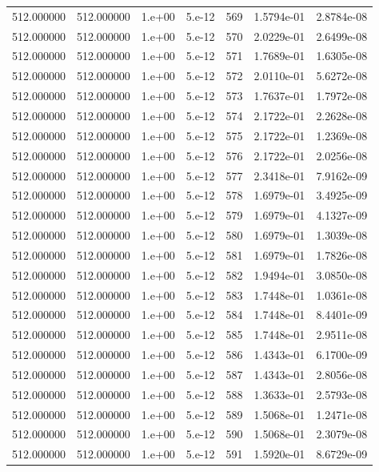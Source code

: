 \begin{table}[htbp]
\begin{tabular}{rrrrrrr}
512.000000 & 512.000000 & 1.e+00 & 5.e-12 & 569 & 1.5794e-01 & 2.8784e-08 \\
512.000000 & 512.000000 & 1.e+00 & 5.e-12 & 570 & 2.0229e-01 & 2.6499e-08 \\
512.000000 & 512.000000 & 1.e+00 & 5.e-12 & 571 & 1.7689e-01 & 1.6305e-08 \\
512.000000 & 512.000000 & 1.e+00 & 5.e-12 & 572 & 2.0110e-01 & 5.6272e-08 \\
512.000000 & 512.000000 & 1.e+00 & 5.e-12 & 573 & 1.7637e-01 & 1.7972e-08 \\
512.000000 & 512.000000 & 1.e+00 & 5.e-12 & 574 & 2.1722e-01 & 2.2628e-08 \\
512.000000 & 512.000000 & 1.e+00 & 5.e-12 & 575 & 2.1722e-01 & 1.2369e-08 \\
512.000000 & 512.000000 & 1.e+00 & 5.e-12 & 576 & 2.1722e-01 & 2.0256e-08 \\
512.000000 & 512.000000 & 1.e+00 & 5.e-12 & 577 & 2.3418e-01 & 7.9162e-09 \\
512.000000 & 512.000000 & 1.e+00 & 5.e-12 & 578 & 1.6979e-01 & 3.4925e-09 \\
512.000000 & 512.000000 & 1.e+00 & 5.e-12 & 579 & 1.6979e-01 & 4.1327e-09 \\
512.000000 & 512.000000 & 1.e+00 & 5.e-12 & 580 & 1.6979e-01 & 1.3039e-08 \\
512.000000 & 512.000000 & 1.e+00 & 5.e-12 & 581 & 1.6979e-01 & 1.7826e-08 \\
512.000000 & 512.000000 & 1.e+00 & 5.e-12 & 582 & 1.9494e-01 & 3.0850e-08 \\
512.000000 & 512.000000 & 1.e+00 & 5.e-12 & 583 & 1.7448e-01 & 1.0361e-08 \\
512.000000 & 512.000000 & 1.e+00 & 5.e-12 & 584 & 1.7448e-01 & 8.4401e-09 \\
512.000000 & 512.000000 & 1.e+00 & 5.e-12 & 585 & 1.7448e-01 & 2.9511e-08 \\
512.000000 & 512.000000 & 1.e+00 & 5.e-12 & 586 & 1.4343e-01 & 6.1700e-09 \\
512.000000 & 512.000000 & 1.e+00 & 5.e-12 & 587 & 1.4343e-01 & 2.8056e-08 \\
512.000000 & 512.000000 & 1.e+00 & 5.e-12 & 588 & 1.3633e-01 & 2.5793e-08 \\
512.000000 & 512.000000 & 1.e+00 & 5.e-12 & 589 & 1.5068e-01 & 1.2471e-08 \\
512.000000 & 512.000000 & 1.e+00 & 5.e-12 & 590 & 1.5068e-01 & 2.3079e-08 \\
512.000000 & 512.000000 & 1.e+00 & 5.e-12 & 591 & 1.5920e-01 & 8.6729e-09 \\

\end{tabular}
\end{table}
